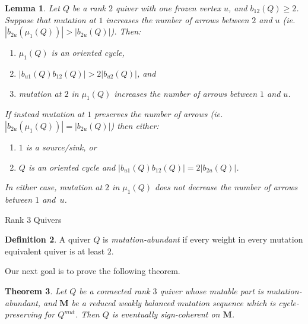 \documentclass[12pt]{amsart}
\makeatletter
\newtheorem{thm}{Theorem}[section]
\newtheorem{lem}[thm]{Lemma}
\theoremstyle{definition}
\newtheorem{defn}[thm]{Definition}
\theoremstyle{remark}
\numberwithin{equation}{section}
\def\subsection{\@startsection{subsection}{3}%
  \z@{.5\linespacing\@plus.7\linespacing}{.1\linespacing}%
  {\bfseries}}
\makeatother
\begin{document}
\begin{lem}
\label{lem: rank 2 ascents}
Let $Q$ be a rank $2$ quiver with one frozen vertex $u$, and $b_{12}(Q) \geq 2$.
Suppose that mutation at $1$ increases the number of arrows between $2$ and $u$ (ie. $|b_{2u}(\mu_1(Q))| > |b_{2u}(Q)|$). 
Then: 
\begin{enumerate}
    \item $\mu_1(Q)$ is an oriented cycle,
    \item $|b_{u1}(Q) b_{12}(Q)| > 2 |b_{u2}(Q)|$, and 
    \item mutation at $2$ in $\mu_1(Q)$ increases the number of arrows between $1$ and $u$.
\end{enumerate} %
If instead mutation at $1$ preserves the number of arrows (ie. $|b_{2u}(\mu_1(Q))| = |b_{2u}(Q)|$) then either:
\begin{enumerate}
    \item[(a)] $1$ is a source/sink, or
    \item[(b)] $Q$ is an oriented cycle and $|b_{u1}(Q)b_{12}(Q)| = 2|b_{2u}(Q)|$.
\end{enumerate}
In either case, mutation at $2$ in $\mu_1(Q)$ does not decrease the number of arrows between $1$ and~$u$.
\end{lem}

\subsection{Rank 3 Quivers}
\label{subsec:rank3 asymptotic}

\begin{defn}
\label{def:mu-abundant}
A quiver $Q$ is \emph{mutation-abundant} if every weight in every mutation equivalent quiver is at least $2$.
\end{defn}

Our next goal is to prove the following theorem.  

\begin{thm}
\label{thm: mutation cyclic eventually sign coherent}
Let $Q$ be a connected rank $3$ quiver whose mutable part is mutation-abundant, and $\mathbf M$ be a reduced weakly balanced mutation sequence which is cycle-preserving for $Q^{mut}$. %
Then $Q$ is eventually sign-coherent on $\mathbf M$.
\end{thm}
\end{document}

